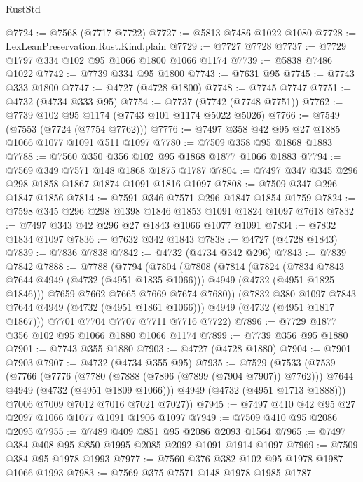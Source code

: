\begin{lexlean}{RustStd}
\begin{coremodule}
{\begin{coremodule}
{{{{{{{{{{{{{{@7724 := @7568 (@7717 @7722)
@7727 := @5813 @7486 @1022 @1080
@7728 := LexLeanPreservation.Rust.Kind.plain
@7729 := @7727 @7728
@7737 := @7729 @1797 @334 @102 @95 @1066 @1800 @1066 @1174
@7739 := @5838 @7486 @1022
@7742 := @7739 @334 @95 @1800
@7743 := @7631 @95
@7745 := @7743 @333 @1800
@7747 := @4727 (@4728 @1800)
@7748 := @7745 @7747
@7751 := @4732 (@4734 @333 @95)
@7754 := @7737 (@7742 (@7748 @7751))
@7762 := @7739 @102 @95 @1174 (@7743 @101 @1174 @5022 @5026)
@7766 := @7549 (@7553 (@7724 (@7754 @7762)))
@7776 := @7497 @358 @42 @95 @27 @1885 @1066 @1077 @1091 @511 @1097
@7780 := @7509 @358 @95 @1868 @1883
@7788 := @7560 @350 @356 @102 @95 @1868 @1877 @1066 @1883
@7794 := @7569 @349 @7571 @148 @1868 @1875 @1787
@7804 := @7497 @347 @345 @296 @298 @1858 @1867 @1874 @1091 @1816 @1097
@7808 := @7509 @347 @296 @1847 @1856
@7814 := @7591 @346 @7571 @296 @1847 @1854 @1759
@7824 := @7598 @345 @296 @298 @1398 @1846 @1853 @1091 @1824 @1097 @7618
@7832 := @7497 @343 @42 @296 @27 @1843 @1066 @1077 @1091
@7834 := @7832 @1834 @1097
@7836 := @7632 @342 @1843
@7838 := @4727 (@4728 @1843)
@7839 := @7836 @7838
@7842 := @4732 (@4734 @342 @296)
@7843 := @7839 @7842
@7888 := @7788
    (@7794
      (@7804
        (@7808
          (@7814
            (@7824
              (@7834 @7843 @7644 @4949 (@4732 (@4951 @1835 @1066)))
              @4949
              (@4732 (@4951 @1825 @1846)))
            @7659
            @7662
            @7665
            @7669
            @7674
            @7680))
        (@7832 @380 @1097 @7843 @7644 @4949 (@4732 (@4951 @1861 @1066)))
        @4949
        (@4732 (@4951 @1817 @1867)))
      @7701
      @7704
      @7707
      @7711
      @7716
      @7722)
@7896 := @7729 @1877 @356 @102 @95 @1066 @1880 @1066 @1174
@7899 := @7739 @356 @95 @1880
@7901 := @7743 @355 @1880
@7903 := @4727 (@4728 @1880)
@7904 := @7901 @7903
@7907 := @4732 (@4734 @355 @95)
@7935 := @7529
    (@7533
      (@7539
        (@7766
          (@7776
            (@7780 (@7888 (@7896 (@7899 (@7904 @7907)) @7762)))
            @7644
            @4949
            (@4732 (@4951 @1809 @1066)))
          @4949
          (@4732 (@4951 @1713 @1888)))
        @7006
        @7009
        @7012
        @7016
        @7021
        @7027))
@7945 := @7497 @410 @42 @95 @27 @2097 @1066 @1077 @1091 @1906 @1097
@7949 := @7509 @410 @95 @2086 @2095
@7955 := @7489 @409 @851 @95 @2086 @2093 @1564
@7965 := @7497 @384 @408 @95 @850 @1995 @2085 @2092 @1091 @1914 @1097
@7969 := @7509 @384 @95 @1978 @1993
@7977 := @7560 @376 @382 @102 @95 @1978 @1987 @1066 @1993
@7983 := @7569 @375 @7571 @148 @1978 @1985 @1787
}}}}}}}}}}}}}}
\end{coremodule}}
\end{coremodule}
\end{lexlean}
